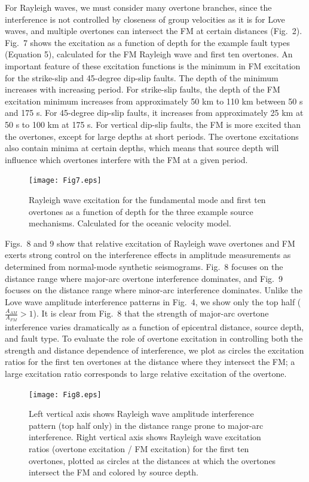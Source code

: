 \documentclass[extra,mreferee]{gji}
\begin{document}
 For Rayleigh waves, we must consider many overtone branches, since the interference is not controlled by closeness of group velocities as it is for Love waves, and multiple overtones can intersect the FM at certain distances (Fig.\ 2). Fig.\ 7 shows the excitation as a function of depth for the example fault types (Equation 5), calculated for the FM Rayleigh wave and first ten overtones. An important feature of these excitation functions is the minimum in FM excitation for the strike-slip and 45-degree dip-slip faults. The depth of the minimum increases with increasing period. For strike-slip faults, the depth of the FM excitation minimum increases from approximately 50 km to 110 km between 50 s and 175 s. For 45-degree dip-slip faults, it increases from approximately 25 km at 50 s to 100 km at 175 s. For vertical dip-slip faults, the FM is more excited than the overtones, except for large depths at short periods. The  overtone excitations also contain minima at certain depths, which means that source depth will influence which overtones interfere with the FM at a given period.  
 
      \begin{figure}
 \texttt{[image: Fig7.eps]}
 \caption{Rayleigh wave excitation for the fundamental mode and first ten overtones as a function of depth for the three example source mechanisms. Calculated for the oceanic velocity model.}
 \end{figure}

 Figs.\ 8 and 9 show that relative excitation of Rayleigh wave overtones and FM exerts strong control on the interference effects in amplitude measurements as determined from normal-mode synthetic seismograms. Fig.\ 8 focuses on the distance range where major-arc overtone interference dominates, and Fig.\ 9 focuses on the distance range where minor-arc interference dominates. Unlike the Love wave amplitude interference patterns in Fig.\ 4, we show only the top half ($\frac{A_{AM}}{A_{FM}}>1$). It is clear from Fig.\ 8 that the strength of major-arc overtone interference varies dramatically as a function of epicentral distance, source depth, and fault type. To evaluate the role of overtone excitation in controlling both the strength and distance dependence of interference, we plot as circles the excitation ratios for the first ten overtones at the distance where they intersect the FM; a large excitation ratio corresponds to large relative excitation of the overtone.

\begin{figure}
 \texttt{[image: Fig8.eps]}
 \caption{ Left vertical axis shows Rayleigh wave amplitude interference pattern (top half only) in the distance range prone to major-arc interference. Right vertical axis shows Rayleigh wave excitation ratios (overtone excitation / FM excitation) for the first ten overtones, plotted as circles at the distances at which the overtones intersect the FM and colored by source depth. }
\end{figure}
     
\end{document}
